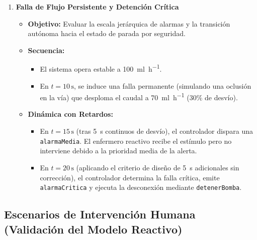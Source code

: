 \documentclass[11pt,a4paper]{article}
\begin{document}
\begin{enumerate}[label=\textbf{Escenario \arabic*:}, startingvalue=3, leftmargin=*]
    \item \textbf{Falla de Flujo Persistente y Detención Crítica}
    \begin{itemize}
        \item \textbf{Objetivo:} Evaluar la escala jerárquica de alarmas y la transición autónoma hacia el estado de parada por seguridad.
        \item \textbf{Secuencia:}
        \begin{itemize}
            \item El sistema opera estable a \SI{100}{\ml\per\hour}.
            \item En $t = 10\,\text{s}$, se induce una falla permanente (simulando una oclusión en la vía) que desploma el caudal a \SI{70}{\ml\per\hour} ($30\%$ de desvío).
        \end{itemize}
        \item \textbf{Dinámica con Retardos:} 
        \begin{itemize}
            \item En $t = 15\,\text{s}$ (tras \SI{5}{\second} continuos de desvío), el controlador dispara una \texttt{alarmaMedia}. El enfermero reactivo recibe el estímulo pero no interviene debido a la prioridad media de la alerta.
            \item En $t = 20\,\text{s}$ (aplicando el criterio de diseño de \SI{5}{\second} adicionales sin corrección), el controlador determina la falla crítica, emite \texttt{alarmaCritica} y ejecuta la desconexión mediante \texttt{detenerBomba}.
        \end{itemize}
    \end{itemize}
\end{enumerate}

\subsection{Escenarios de Intervención Humana (Validación del Modelo Reactivo)}
\end{document}
